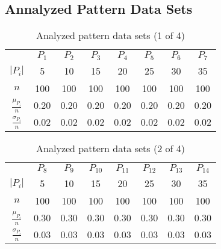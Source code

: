 \documentclass[12pt]{article}
\begin{document}
    
    \begin{appendices}
    
\section{Annalyzed Pattern Data Sets}

    

        \begin{table}[H]
        \centering
        \def\arraystretch{1.5}
        \begin{tabular}{cccccccc}
        
 & $P_{1}$  & $P_{2}$  & $P_{3}$  & $P_{4}$  & $P_{5}$  & $P_{6}$  & $P_{7}$  \\ \cline{2-8}
$\left|P_i\right|$  & 5  & 10  & 15  & 20  & 25  & 30  & 35 \\
$n$  & 100  & 100  & 100  & 100  & 100  & 100  & 100 \\
$\frac{\mu_{P_i}}{n}$  & $0.20$  & $0.20$  & $0.20$  & $0.20$  & $0.20$  & $0.20$  & $0.20$ \\
$\frac{\sigma_{P_i}}{n}$  & $0.02$  & $0.02$  & $0.02$  & $0.02$  & $0.02$  & $0.02$  & $0.02$ 
        \end{tabular}
        \caption{Analyzed pattern data sets (1 of 4)}
        \end{table}
        

        \begin{table}[H]
        \centering
        \def\arraystretch{1.5}
        \begin{tabular}{cccccccc}
        
 & $P_{8}$  & $P_{9}$  & $P_{10}$  & $P_{11}$  & $P_{12}$  & $P_{13}$  & $P_{14}$  \\ \cline{2-8}
$\left|P_i\right|$  & 5  & 10  & 15  & 20  & 25  & 30  & 35 \\
$n$  & 100  & 100  & 100  & 100  & 100  & 100  & 100 \\
$\frac{\mu_{P_i}}{n}$  & $0.30$  & $0.30$  & $0.30$  & $0.30$  & $0.30$  & $0.30$  & $0.30$ \\
$\frac{\sigma_{P_i}}{n}$  & $0.03$  & $0.03$  & $0.03$  & $0.03$  & $0.03$  & $0.03$  & $0.03$ 
        \end{tabular}
        \caption{Analyzed pattern data sets (2 of 4)}
        \end{table}
        


\end{appendices}
\end{document}
